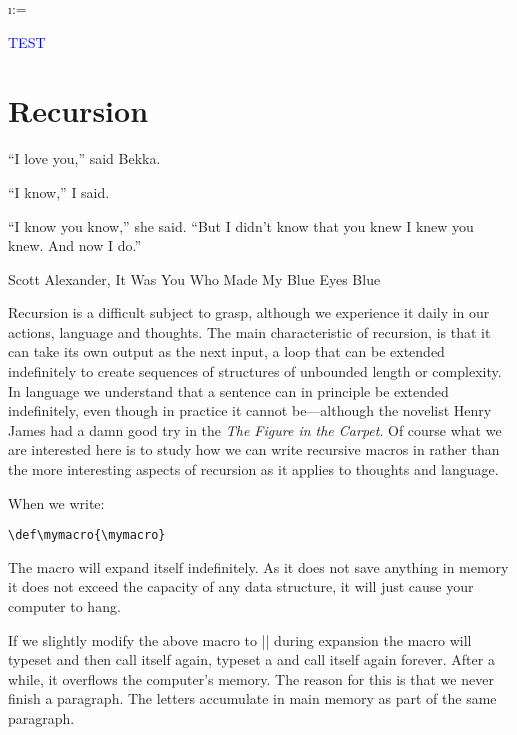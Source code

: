 \begin{teX}
\long\def\@for#1:=#2\do#3{%
\expandafter\def\expandafter\@fortmp\expandafter{#2}%
\ifx\@fortmp\@empty \else
\expandafter\@forloop#2 ;\@nil;\@nil\@@#1{#3}\fi}

\long\def\@iforloop#1;#2\@@#3#4{\def#3{#1}\ifx #3\@nnil
\expandafter\@fornoop \else
#4\relax\expandafter\@iforloop\fi#2\@@#3{#4}}


\@for\i:=\mathList\do{%
  \ensuremath \i --  
 }


\meaning\loop 
\def\a#1{\textcolor{blue}{\uppercase{#1}}}
\def\b{test}
\expandafter\a\b

\a\b
\end{teX}


\section{Recursion}
\epigraph{“I love you,” said Bekka.

“I know,” I said.

“I know you know,” she said. “But I didn’t know that you knew I knew you knew. And now I do.” }
{Scott Alexander, It Was You Who Made My Blue Eyes Blue}
Recursion is a difficult subject to grasp, although we experience it daily in our actions, language and thoughts. 
The main characteristic of recursion, is that it can take its own output as the next input, a loop that can be extended indefinitely to create sequences of structures of unbounded length or complexity. In language we understand that a sentence can in principle be extended indefinitely, even though in practice it cannot be---although the novelist Henry James had a damn good try in the \emph{The Figure in the Carpet}. Of course what we are interested here is to study how we can write recursive macros in \tex rather than the more interesting aspects of recursion as it applies to thoughts and language. 

When we write:

\begin{verbatim}
\def\mymacro{\mymacro}
\end{verbatim}

The macro will expand itself indefinitely. As it does not save anything in memory it does not exceed the capacity of any data structure, it will just cause your computer to hang.

If we slightly modify the above macro to |\def\mymacro{a \mymacro}| during expansion the macro will typeset and then call itself again, typeset a and call itself again forever. After a while, it overflows the computer’s memory. The reason for this is that we never finish a paragraph. The letters accumulate in main memory as part of the same paragraph.



